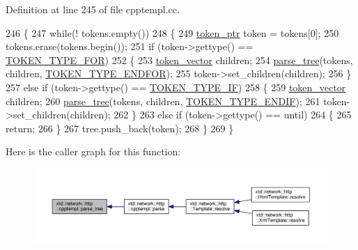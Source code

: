 Definition at line 245 of file cpptempl.\-cc.


\begin{DoxyCode}
246 \{
247   \textcolor{keywordflow}{while}(! tokens.empty())
248   \{
249     \hyperlink{namespacextd_1_1network_1_1http_1_1cpptempl_a09d1bd238d03342e60f0c20c679c0c88}{token\_ptr} token = tokens[0];
250     tokens.erase(tokens.begin());
251     \textcolor{keywordflow}{if} (token->gettype() == \hyperlink{namespacextd_1_1network_1_1http_1_1cpptempl_a39833083d228a5b5ef9f6bb7896479eea77914f6881c1bc9ec1910ca843bb6965}{TOKEN\_TYPE\_FOR})
252     \{
253       \hyperlink{namespacextd_1_1network_1_1http_1_1cpptempl_a38606cfbbfe81ed46ea9b0cf064de956}{token\_vector} children;
254       \hyperlink{namespacextd_1_1network_1_1http_1_1cpptempl_a27515db5dde2876849fa316963a67e63}{parse\_tree}(tokens, children, \hyperlink{namespacextd_1_1network_1_1http_1_1cpptempl_a39833083d228a5b5ef9f6bb7896479eea7a23df3b1f7078c58e56a3c51c24948c}{TOKEN\_TYPE\_ENDFOR});
255       token->set\_children(children);
256     \}
257     \textcolor{keywordflow}{else} \textcolor{keywordflow}{if} (token->gettype() == \hyperlink{namespacextd_1_1network_1_1http_1_1cpptempl_a39833083d228a5b5ef9f6bb7896479eea63ca41e19f481129f654b675913cc557}{TOKEN\_TYPE\_IF})
258     \{
259       \hyperlink{namespacextd_1_1network_1_1http_1_1cpptempl_a38606cfbbfe81ed46ea9b0cf064de956}{token\_vector} children;
260       \hyperlink{namespacextd_1_1network_1_1http_1_1cpptempl_a27515db5dde2876849fa316963a67e63}{parse\_tree}(tokens, children, \hyperlink{namespacextd_1_1network_1_1http_1_1cpptempl_a39833083d228a5b5ef9f6bb7896479eea20879254cae890cea9ab4fbdb6223165}{TOKEN\_TYPE\_ENDIF});
261       token->set\_children(children);
262     \}
263     \textcolor{keywordflow}{else} \textcolor{keywordflow}{if} (token->gettype() == until)
264     \{
265       \textcolor{keywordflow}{return};
266     \}
267     tree.push\_back(token);
268   \}
269 \}
\end{DoxyCode}


Here is the caller graph for this function\-:
\nopagebreak
\begin{figure}[H]
\begin{center}
\leavevmode
\includegraphics[width=350pt]{namespacextd_1_1network_1_1http_1_1cpptempl_a27515db5dde2876849fa316963a67e63_icgraph}
\end{center}
\end{figure}



